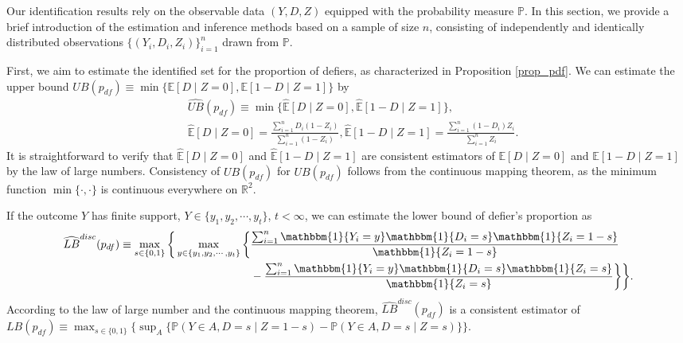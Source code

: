 \documentclass[12pt]{article}
\theoremstyle{plain}
\theoremstyle{definition}
\theoremstyle{remark}
\begin{document}
Our identification results rely on the observable data $(Y, D, Z)$ equipped with the probability measure $\mathbb{P}$. In this section, we provide a brief introduction of the estimation and inference methods based on a sample of size $n$, consisting of independently and identically distributed observations $\{(Y_i, D_i, Z_i)\}_{i=1}^n$ drawn from $\mathbb{P}$.

First, we aim to estimate the identified set for the proportion of defiers, as characterized in Proposition \ref{prop_pdf}. We can estimate the upper bound $UB(p_{df}) \equiv \min \{\mathbb{E}[D \mid Z=0], \mathbb{E}[1-D \mid Z=1]\}$ by 
\begin{equation*}
    \begin{aligned}
        & \widehat{UB}(p_{df}) \equiv \min \{\widehat{\mathbb{E}}[D \mid Z=0], \widehat{\mathbb{E}}[1-D \mid Z=1]\}, \\
        &\widehat{\mathbb{E}}[D \mid Z=0] = \frac{\sum_{i=1}^{n}D_i (1-Z_i)}{\sum_{i=1}^{n}(1-Z_i)}, \widehat{\mathbb{E}}[1-D \mid Z=1] = \frac{\sum_{i=1}^{n}(1-D_i) Z_i}{\sum_{i=1}^{n} Z_i}.
    \end{aligned}
\end{equation*}
It is straightforward to verify that $\widehat{\mathbb{E}}[D \mid Z=0]$ and $\widehat{\mathbb{E}}[1 - D \mid Z=1]$ are consistent estimators of $\mathbb{E}[D \mid Z=0]$ and $\mathbb{E}[1 - D \mid Z=1]$ by the law of large numbers. Consistency of $\widehat{UB}(p_{df})$ for $UB(p_{df})$ follows from the continuous mapping theorem, as the minimum function $\min\{\cdot, \cdot\}$ is continuous everywhere on $\mathbb{R}^2$.

If the outcome $Y$ has finite support, $Y \in \{y_1, y_2, \cdots, y_t\}$, $t < \infty$, we can estimate the lower bound of defier's proportion as 
\begin{equation*}
    \begin{aligned}
        \widehat{LB}^{disc}(p_{df}) \equiv \max_{s \in \{0,1\}}\bigg\{ \max_{y \in \{y_1, y_2, \cdots, y_t\}} \bigg\{ & \frac{\sum_{i=1}^{n} \mathbbm{1} \{Y_i = y\} \mathbbm{1}\{D_i = s\} \mathbbm{1}\{Z_i = 1-s\}}{\mathbbm{1}\{Z_i = 1-s\}} \\
        &- \frac{\sum_{i=1}^{n} \mathbbm{1} \{Y_i = y\} \mathbbm{1}\{D_i = s\} \mathbbm{1}\{Z_i = s\}}{\mathbbm{1}\{Z_i = s\}} \bigg\} \bigg\}.
    \end{aligned}
\end{equation*}
According to the law of large number and the continuous mapping theorem, $\widehat{LB}^{disc}(p_{df})$ is a consistent estimator of $LB(p_{df}) \equiv \max _{s \in\{0,1\}}\big\{\sup _A\{\mathbb{P}(Y \in A, D=s \mid Z=1-s)-\mathbb{P}(Y \in A, D=s \mid Z=s)\}\big\}$.
\end{document}

